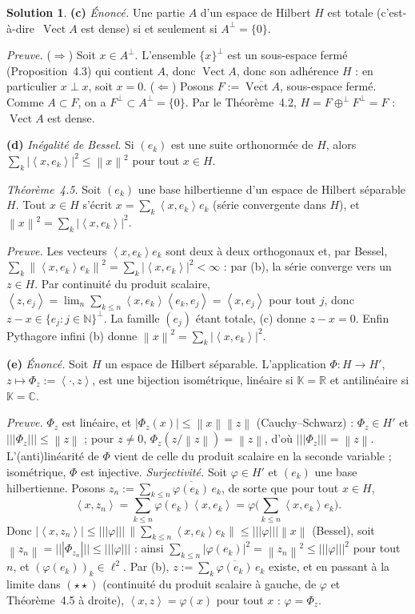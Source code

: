 \documentclass[11pt,a4paper]{article}
\newcommand{\R}{\mathbb{R}}
\newcommand{\N}{\mathbb{N}}
\newcommand{\C}{\mathbb{C}}
\newcommand{\K}{\mathbb{K}}
\newcommand{\adh}[1]{\overline{#1}}
\newcommand{\Vect}{\operatorname{Vect}}
\newcommand{\norm}[1]{\left\|#1\right\|}
\newcommand{\opnorm}[1]{|\!|\!|#1|\!|\!|}
\newcommand{\ps}[2]{\left\langle #1,#2\right\rangle}
\newcommand{\ie}{c'est-à-dire}
\theoremstyle{definition}
\newtheorem*{solution}{Solution}
\begin{document}
\begin{solution}
\medskip
\noindent\textbf{(c)} \emph{Énoncé.} Une partie $A$ d'un espace de Hilbert $H$ est totale (\ie\ $\Vect A$ est dense) si et seulement si $A^\perp=\{0\}$.

\emph{Preuve.} ($\Rightarrow$) Soit $x\in A^\perp$. L'ensemble $\{x\}^\perp$ est un sous-espace fermé (Proposition~4.3) qui contient $A$, donc $\Vect A$, donc son adhérence $H$ : en particulier $x\perp x$, soit $x=0$. ($\Leftarrow$) Posons $F:=\adh{\Vect A}$, sous-espace fermé. Comme $A\subset F$, on a $F^\perp\subset A^\perp=\{0\}$. Par le Théorème~4.2, $H=F\oplus^\perp F^\perp=F$ : $\Vect A$ est dense.

\medskip
\noindent\textbf{(d)} \emph{Inégalité de Bessel.} Si $(e_k)$ est une suite orthonormée de $H$, alors $\sum_k|\ps x{e_k}|^2\le\norm x^2$ pour tout $x\in H$.

\emph{Théorème~4.5.} Soit $(e_k)$ une base hilbertienne d'un espace de Hilbert séparable $H$. Tout $x\in H$ s'écrit $x=\sum_k\ps x{e_k}e_k$ (série convergente dans $H$), et $\norm x^2=\sum_k|\ps x{e_k}|^2$.

\emph{Preuve.} Les vecteurs $\ps x{e_k}e_k$ sont deux à deux orthogonaux et, par Bessel, $\sum_k\norm{\ps x{e_k}e_k}^2=\sum_k|\ps x{e_k}|^2<\infty$ : par (b), la série converge vers un $z\in H$. Par continuité du produit scalaire, $\ps z{e_j}=\lim_n\sum_{k\le n}\ps x{e_k}\ps{e_k}{e_j}=\ps x{e_j}$ pour tout $j$, donc $z-x\in\{e_j:j\in\N\}^\perp$. La famille $(e_j)$ étant totale, (c) donne $z-x=0$. Enfin Pythagore infini (b) donne $\norm x^2=\sum_k|\ps x{e_k}|^2$.

\medskip
\noindent\textbf{(e)} \emph{Énoncé.} Soit $H$ un espace de Hilbert séparable. L'application $\Phi:H\to H'$, $z\mapsto\Phi_z:=\ps\cdot z$, est une bijection isométrique, linéaire si $\K=\R$ et antilinéaire si $\K=\C$.

\emph{Preuve.} $\Phi_z$ est linéaire, et $|\Phi_z(x)|\le\norm x\norm z$ (Cauchy--Schwarz) : $\Phi_z\in H'$ et $\opnorm{\Phi_z}\le\norm z$ ; pour $z\ne0$, $\Phi_z(z/\norm z)=\norm z$, d'où $\opnorm{\Phi_z}=\norm z$. L'(anti)linéarité de $\Phi$ vient de celle du produit scalaire en la seconde variable ; isométrique, $\Phi$ est injective. \emph{Surjectivité.} Soit $\varphi\in H'$ et $(e_k)$ une base hilbertienne. Posons $z_n:=\sum_{k\le n}\overline{\varphi(e_k)}\,e_k$, de sorte que pour tout $x\in H$,
\[
\ps x{z_n}=\sum_{k\le n}\varphi(e_k)\ps x{e_k}=\varphi\Big(\sum_{k\le n}\ps x{e_k}e_k\Big).\tag{$\star\star$}
\]
Donc $|\ps x{z_n}|\le\opnorm\varphi\,\big\|\sum_{k\le n}\ps x{e_k}e_k\big\|\le\opnorm\varphi\norm x$ (Bessel), soit $\norm{z_n}=\opnorm{\Phi_{z_n}}\le\opnorm\varphi$ : ainsi $\sum_{k\le n}|\varphi(e_k)|^2=\norm{z_n}^2\le\opnorm\varphi^2$ pour tout $n$, et $(\varphi(e_k))_k\in\ell^2$. Par (b), $z:=\sum_k\overline{\varphi(e_k)}\,e_k$ existe, et en passant à la limite dans $(\star\star)$ (continuité du produit scalaire à gauche, de $\varphi$ et Théorème~4.5 à droite), $\ps xz=\varphi(x)$ pour tout $x$ : $\varphi=\Phi_z$.


\end{solution}
\end{document}
